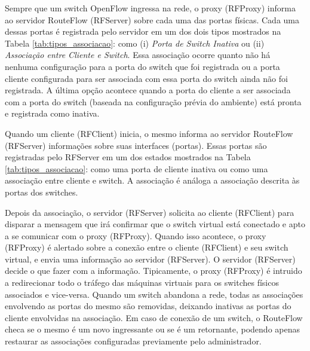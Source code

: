 Sempre que um switch OpenFlow ingressa na rede, o proxy (RFProxy)
informa ao servidor RouteFlow (RFServer) sobre cada uma das
portas físicas. Cada uma dessas portas é registrada pelo servidor
em um dos dois tipos mostrados na Tabela \ref{tab:tipos_associacao}:
como (i) \textit{Porta de Switch Inativa} ou (ii) \textit{Associação
entre Cliente e Switch}. Essa associação ocorre quanto 
não há nenhuma configuração para a porta do switch que
foi registrada ou a porta cliente configurada para ser associada
com essa porta do switch ainda não foi registrada. A última 
opção acontece quando a porta do cliente a ser associada com a
porta do switch (baseada na configuração prévia do ambiente)
está pronta e registrada como inativa.

Quando um cliente (RFClient) inicia, o mesmo informa ao servidor RouteFlow (RFServer)
informações sobre suas interfaces (portas). Essas portas são 
registradas pelo RFServer em um dos estados mostrados na
Tabela \ref{tab:tipos_associacao}: como uma porta de cliente
inativa ou como uma associação entre cliente e switch. A 
associação é análoga a associação descrita às portas dos
switches.

Depois da associação, o servidor (RFServer) solicita ao cliente (RFClient) para
disparar a mensagem que irá confirmar que o switch virtual está
conectado e apto a se comunicar com o proxy (RFProxy). Quando isso
acontece, o proxy (RFProxy) é alertado sobre a conexão entre o 
cliente (RFClient) e seu switch virtual, e envia uma informação ao 
servidor (RFServer). O servidor (RFServer) decide o que fazer com a informação.
Tipicamente, o proxy (RFProxy) é intruido a redirecionar todo o tráfego
das máquinas virtuais para os switches físicos associados e 
vice-versa. Quando um switch abandona a rede, todas as 
associações envolvendo as portas do mesmo são removidas,
deixando inativas as portas do cliente envolvidas na associação.
Em caso de conexão de um switch, o RouteFlow checa se o 
mesmo é um novo ingressante ou se é um retornante, podendo
apenas restaurar as associações configuradas previamente 
pelo administrador.


